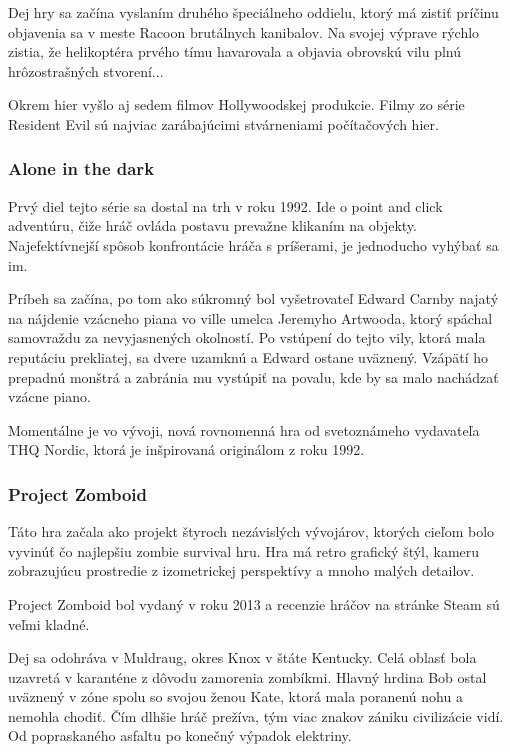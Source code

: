 \documentclass[10pt,oneoside,slovak,a4paper]{article}
\begin{document}
Dej hry sa začína vyslaním druhého špeciálneho oddielu, ktorý má zistiť príčinu objavenia sa v meste Racoon brutálnych kanibalov. Na svojej výprave rýchlo zistia, že helikoptéra prvého tímu havarovala a objavia obrovskú vilu plnú hrôzostrašných stvorení...\cite{WindowsCentral}

Okrem hier vyšlo aj sedem filmov Hollywoodskej produkcie. Filmy zo série Resident Evil sú najviac zarábajúcimi stvárneniami počítačových hier. \cite{Ehli}


\subsubsection{Alone in the dark}
Prvý diel tejto série sa dostal na trh v roku 1992. Ide o point and click adventúru, čiže hráč ovláda postavu prevažne klikaním na objekty. Najefektívnejší spôsob konfrontácie hráča s príšerami, je jednoducho vyhýbať sa im.\cite{Reid}

Príbeh sa začína, po tom ako súkromný bol vyšetrovateľ Edward Carnby najatý na nájdenie vzácneho piana vo ville umelca Jeremyho Artwooda, ktorý spáchal samovraždu za nevyjasnených okolností. Po vstúpení do tejto vily, ktorá mala reputáciu prekliatej, sa dvere uzamknú a Edward ostane uväznený. Vzápätí ho prepadnú monštrá a zabránia mu vystúpiť na povalu, kde by sa malo nachádzať vzácne piano.\cite{Swan}

Momentálne je vo vývoji, nová  rovnomenná hra od svetoznámeho vydavateľa THQ Nordic, ktorá je inšpirovaná originálom z roku 1992.\cite{Alone}

\subsubsection{Project Zomboid}

Táto  hra začala ako projekt štyroch nezávislých vývojárov, ktorých cieľom bolo vyvinúť čo najlepšiu zombie survival hru. Hra má retro grafický štýl, kameru zobrazujúcu prostredie z izometrickej perspektívy a mnoho malých detailov.\cite{Mosel}

Project Zomboid bol vydaný v roku 2013 a recenzie hráčov na stránke Steam sú veľmi kladné.\cite{Zomboid}

Dej sa odohráva v Muldraug, okres Knox  v štáte Kentucky. Celá oblasť bola uzavretá v karanténe z dôvodu zamorenia zombíkmi.  Hlavný hrdina Bob ostal uväznený v zóne spolu so svojou ženou Kate, ktorá mala poranenú nohu a nemohla chodiť.
Čím dlhšie hráč prežíva, tým viac znakov zániku civilizácie vidí. Od popraskaného asfaltu po konečný výpadok elektriny. 
\end{document}
